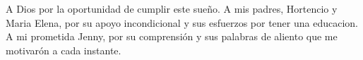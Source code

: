 \begin{dedication}
A Dios por la oportunidad de cumplir este sueño. A mis padres, Hortencio y Maria Elena, por su apoyo incondicional y sus esfuerzos por tener una educacion. A mi prometida Jenny, por su comprensi\'on y sus palabras de aliento que me motivar\'on a cada instante. 
\end{dedication}
